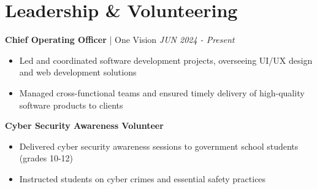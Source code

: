 \documentclass[10pt, letterpaper]{article}
\newenvironment{resumePoints}{
    \begin{itemize}[leftmargin=*,nosep,noitemsep,topsep=2pt,parsep=0pt]
}{\end{itemize}}
\begin{document}
\vspace{-0.1cm}
\section{Leadership \& Volunteering}
\vspace{-0.2cm}

\textbf{Chief Operating Officer} | One Vision \hfill \textit{JUN 2024 - Present}
\begin{resumePoints}
    \item Led and coordinated software development projects, overseeing UI/UX design and web development solutions
    \item Managed cross-functional teams and ensured timely delivery of high-quality software products to clients
\end{resumePoints}


\textbf{Cyber Security Awareness Volunteer}
\begin{resumePoints}
    \item Delivered cyber security awareness sessions to government school students (grades 10-12)
    \item Instructed students on cyber crimes and essential safety practices
\end{resumePoints}
\end{document}
